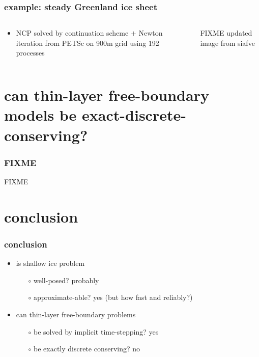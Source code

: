 \documentclass[hide notes,intlimits]{beamer}
\begin{document}
\begin{frame}
  \frametitle{example: steady Greenland ice sheet}

\begin{columns}
\begin{column}{0.5\textwidth}
\begin{itemize}
\item NCP solved by continuation scheme $+$ Newton iteration from PETSc on 900m grid using 192 processes
\end{itemize}
\end{column}
\begin{column}{0.5\textwidth}
FIXME updated image from siafve
\end{column}
\end{columns}

\end{frame}


\section[conservation w free boundaries?]{can thin-layer free-boundary models be exact-discrete-conserving?}

\begin{frame}
  \frametitle{FIXME} 

FIXME
\end{frame}


\section*{conclusion}

\begin{frame}
  \frametitle{conclusion}

\begin{itemize}
\item is shallow ice problem
  \begin{itemize}
  \item[$\circ$] well-posed? \qquad \alert{probably}
  \item[$\circ$] approximate-able? \qquad \alert{yes} (but how fast and reliably?)
  \end{itemize}
\item can thin-layer free-boundary problems
  \begin{itemize}
  \item[$\circ$] be solved by implicit time-stepping? \qquad \alert{yes}
  \item[$\circ$] be exactly discrete conserving? \qquad \alert{no}
  \end{itemize}
\end{itemize}
\end{frame}
\end{document}
